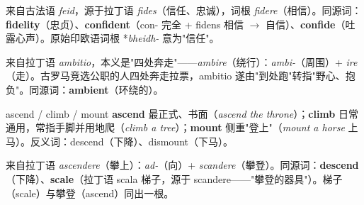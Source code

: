 \documentclass[../main.tex]{subfiles}
\begin{document}

\begin{origin}
来自古法语 \textit{feid}，源于拉丁语 \textit{fides}（信任、忠诚），词根 \textit{fidere}（相信）。同源词：\textbf{fidelity}（忠贞）、\textbf{confident}（con- 完全 + fidens 相信 $\to$ 自信）、\textbf{confide}（吐露心声）。原始印欧语词根 *\textit{bheidh-} 意为"信任"。
\end{origin}





\begin{origin}
来自拉丁语 \textit{ambitio}，本义是"四处奔走"——\textit{ambire}（绕行）：\textit{ambi-}（周围）+ \textit{ire}（走）。古罗马竞选公职的人四处奔走拉票，ambitio 遂由"到处跑"转指"野心、抱负"。同源词：\textbf{ambient}（环绕的）。
\end{origin}



\begin{lex}{ascend / climb / mount}
\textbf{ascend} 最正式、书面（\textit{ascend the throne}）；\textbf{climb} 日常通用，常指手脚并用地爬（\textit{climb a tree}）；\textbf{mount} 侧重"登上"（\textit{mount a horse} 上马）。反义词：descend（下降）、dismount（下马）。
\end{lex}

\begin{origin}
来自拉丁语 \textit{ascendere}（攀上）：\textit{ad-}（向）+ \textit{scandere}（攀登）。同源词：\textbf{descend}（下降）、\textbf{scale}（拉丁语 scala 梯子，源于 scandere——"攀登的器具"）。梯子（scale）与攀登（ascend）同出一根。
\end{origin}

\end{document}
